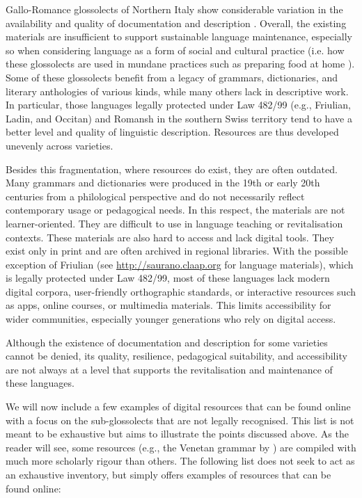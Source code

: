 \documentclass[a4paper,11pt]{article}
\begin{document}
Gallo-Romance glossolects of Northern Italy show considerable variation in the availability and quality of documentation and description \cite{himmelmann2006, dryer2008, chelliah2010, payne2014, bowern2015}. Overall, the existing materials are insufficient to support sustainable language maintenance, especially so when considering language as a form of social and cultural practice (i.e. how these glossolects are used in mundane practices such as preparing food at home \citealt{himmelmann2006}). Some of these glossolects benefit from a legacy of grammars, dictionaries, and literary anthologies of various kinds, while many others lack in descriptive work. In particular, those languages legally protected under Law 482/99 (e.g., Friulian, Ladin, and Occitan) and Romansh in the southern Swiss territory tend to have a better level and quality of linguistic description. Resources are thus developed unevenly across varieties. 

Besides this fragmentation, where resources do exist, they are often outdated. Many grammars and dictionaries were produced in the 19th or early 20th centuries from a philological perspective and do not necessarily reflect contemporary usage or pedagogical needs. In this respect, the materials are not learner-oriented. They are difficult to use in language teaching or revitalisation contexts. These materials are also hard to access and lack digital tools. They exist only in print and are often archived in regional libraries. With the possible exception of Friulian (see \url{http://saurano.claap.org} for language materials), which is legally protected under Law 482/99, most of these languages lack modern digital corpora, user-friendly orthographic standards, or interactive resources such as apps, online courses, or multimedia materials. This limits accessibility for wider communities, especially younger generations who rely on digital access.

Although the existence of documentation and description for some varieties cannot be denied, its quality, resilience, pedagogical suitability, and accessibility are not always at a level that supports the revitalisation and maintenance of these languages.

We will now include a few examples of digital resources that can be found online with a focus on the sub-glossolects that are not legally recognised. This list is not meant to be exhaustive but aims to illustrate the points discussed above. As the reader will see, some resources (e.g., the Venetan grammar by \citet{garzonio2019grammatica}) are compiled with much more scholarly rigour than others. The following list does not seek to act as an exhaustive inventory, but simply offers examples of resources that can be found online:
\end{document}
